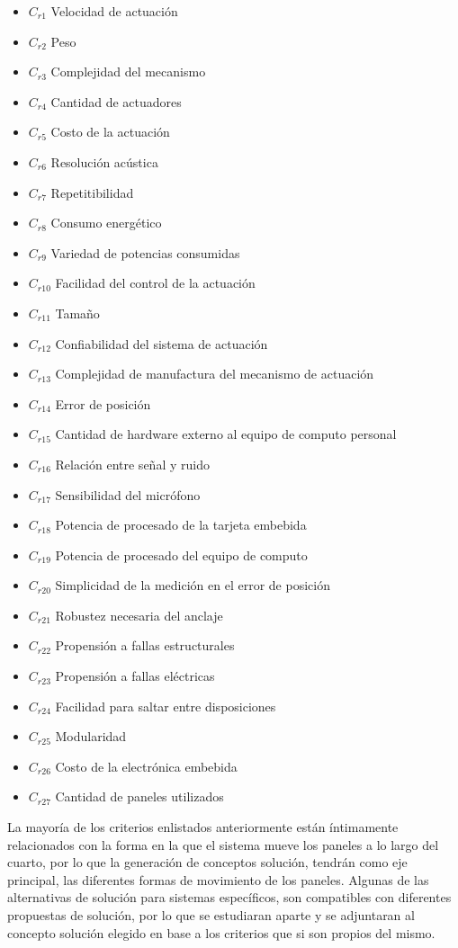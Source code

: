 \begin{itemize}
    \item $C_{r1}$ Velocidad de actuación
    \item $C_{r2}$ Peso
    \item $C_{r3}$ Complejidad del mecanismo
    \item $C_{r4}$ Cantidad de actuadores
    \item $C_{r5}$ Costo de la actuación
    \item $C_{r6}$ Resolución acústica
    \item $C_{r7}$ Repetitibilidad
    \item $C_{r8}$ Consumo energético
    \item $C_{r9}$ Variedad de potencias consumidas
    \item $C_{r10}$ Facilidad del control de la actuación
    \item $C_{r11}$ Tamaño
    \item $C_{r12}$ Confiabilidad del sistema de actuación
    \item $C_{r13}$ Complejidad de manufactura del mecanismo de actuación
    \item $C_{r14}$ Error de posición 
    \item $C_{r15}$ Cantidad de hardware externo al equipo de computo personal
    \item $C_{r16}$ Relación entre señal y ruido
    \item $C_{r17}$ Sensibilidad del micrófono
    \item $C_{r18}$ Potencia de procesado de la tarjeta embebida
    \item $C_{r19}$ Potencia de procesado del equipo de computo
    \item $C_{r20}$ Simplicidad de la medición en el error de posición
    \item $C_{r21}$ Robustez necesaria del anclaje
    \item $C_{r22}$ Propensión a fallas estructurales
    \item $C_{r23}$ Propensión a fallas eléctricas
    \item $C_{r24}$ Facilidad para saltar entre disposiciones 
    \item $C_{r25}$ Modularidad
    \item $C_{r26}$ Costo de la electrónica embebida
    \item $C_{r27}$ Cantidad de paneles utilizados
\end{itemize}
La mayoría de los criterios enlistados anteriormente están íntimamente relacionados con la forma en la que el sistema mueve los paneles a lo largo del cuarto, por lo que la generación de conceptos solución, tendrán como eje principal, las diferentes formas de movimiento de los paneles.
Algunas de las alternativas de solución para sistemas específicos, son compatibles con diferentes propuestas de solución, por lo que se estudiaran aparte y se adjuntaran al concepto solución elegido en base a los criterios que si son propios del mismo.





